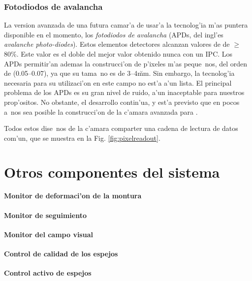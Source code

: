 \subsubsection{Fotodiodos de avalancha}
%
La version avanzada de una futura camar'a de \MAGIC usar'a la
tecnolog'ia m'as puntera disponible en el momento, los
\emph{fotodiodos de avalancha} (APDs, del ingl'es \emph{avalanche
photo-diodes}). Estos elementos detectores alcanzan valores de \QE de
$\geq$80\%. Este valor es el doble del mejor valor obtenido nunca con
un IPC. Los APDs permitir'an ademas la construcci'on de p'ixeles m'as
peque~nos, del orden de (0.05\deg--0.07\deg), ya que su tama~no es de 
3--4\u{mm}. Sin embargo, la tecnolog'ia necesaria para su utilizaci'on
en este campo no est'a a'un lista. El principal problema de los APDs
es su gran nivel de ruido, a'un inaceptable para nuestros prop'ositos.
No obstante, el desarrollo contin'ua, y est'a previsto que en pocos
a~nos sea posible la construcci'on de la c'amara avanzada para \MAGIC.

Todos estos dise~nos de la c'amara comparter una cadena de lectura de
datos com'un, que se muestra en la Fig. \ref{fig:pixelreadout}. 

\section{Otros componentes del sistema}

\paragraph{Monitor de deformaci'on de la montura}

\paragraph{Monitor de seguimiento}

\paragraph{Monitor del campo visual}

\paragraph{Control de calidad de los espejos}

\paragraph{Control activo de espejos}


